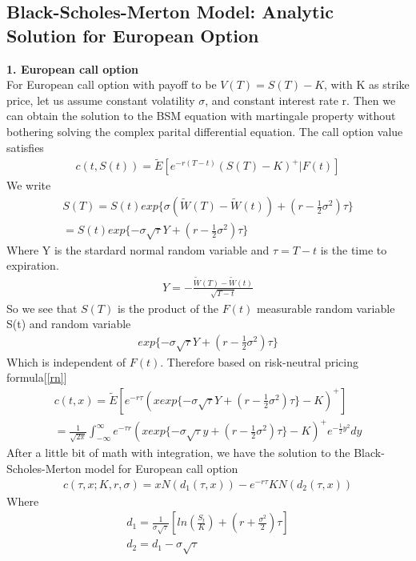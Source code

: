 \documentclass[a4paper]{article}
\begin{document}
\subsection{Black-Scholes-Merton Model: Analytic Solution for European Option}
{\bf1. European call option}\\
For European call option with payoff to be $V(T) = S(T) - K$, with K as strike price, let us assume constant volatility $\sigma$, and constant interest rate r. 
Then we can obtain the solution to the BSM equation with martingale property without bothering solving the complex parital
differential equation. The call option value satisfies
\begin{align*}
	c(t, S(t)) = \tilde E[e^{-r(T-t)}(S(T)-K)^+|F(t)]
\end{align*}
We write
\begin{align*}
	S(T) = S(t) exp\{\sigma(\tilde W(T) -\tilde W(t)) + (r - \frac{1}{2} \sigma^2) \tau\} \\
	     = S(t) exp\{-\sigma \sqrt{\tau} Y + (r - \frac{1}{2}\sigma^2)\tau\}
\end{align*}
Where Y is the stardard normal random variable and $\tau = T - t$ is the time to expiration. 
\begin{align*}
        Y = -\frac{\tilde W(T) - \tilde W(t)}{\sqrt{T - t}}
\end{align*}
So we see that $S(T)$ is the product of the $F(t)$ measurable random variable S(t) and random variable
\begin{align*}
        exp\{-\sigma \sqrt{\tau} Y +(r - \frac{1}{2} \sigma^2) \tau \}
\end{align*}
Which is independent of $F(t)$.
Therefore based on risk-neutral pricing formula[\ref{rn}]
\begin{align*}
        c(t,x) = \tilde E[e^{-r\tau}(x exp\{ -\sigma \sqrt{\tau} Y + (r - \frac{1}{2} \sigma^2)\tau\} -K)^+]\\
        = \frac{1}{\sqrt{2\pi}} \int_{-\infty}^{\infty} e^{-\tau r}(x exp\{-\sigma \sqrt{\tau} y
        +(r -\frac{1}{2}\sigma^2)\tau \} -K)^+ e^{-\frac{1}{2}y^2} dy
\end{align*}
After a little bit of math with integration, we have the solution to the Black-Scholes-Merton model for European call option
\begin{align*}
	c(\tau,x; K, r, \sigma) = xN(d_1(\tau,x)) - e^{-r\tau}KN(d_2(\tau,x))
\end{align*}
Where
\begin{align*}
	d_1 = \frac{1}{\sigma \sqrt{\tau}}[ln(\frac{S_t}{K}) + (r+ \frac{\sigma^2}{2})\tau] \\
	d_2 = d_1 - \sigma \sqrt{\tau}
\end{align*}
\end{document}
